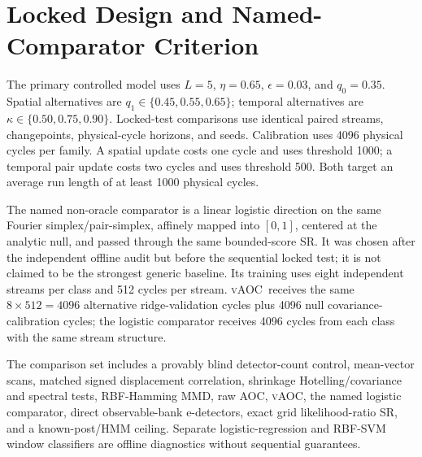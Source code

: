 \documentclass[letterpaper,journal]{IEEEtran}
\newcommand{\AOC}{\textsc{AOC}}
\newcommand{\vAOC}{\textsc{vAOC}}
\begin{document}
\section{Locked Design and Named-Comparator Criterion}

The primary controlled model uses $L=5$, $\eta=0.65$,
$\epsilon=0.03$, and $q_0=0.35$. Spatial alternatives are
$q_1\in\{0.45,0.55,0.65\}$; temporal alternatives are
$\kappa\in\{0.50,0.75,0.90\}$. Locked-test comparisons use identical paired
streams, changepoints, physical-cycle horizons, and seeds. Calibration uses
4096 physical cycles per family. A spatial update costs one cycle and uses
threshold 1000; a temporal pair update costs two cycles and uses threshold
500. Both target an average run length of at least 1000 physical cycles.

The named non-oracle comparator is a linear logistic direction on the same
Fourier simplex/pair-simplex, affinely mapped into $[0,1]$, centered at the
analytic null, and passed through the same bounded-score SR. It was chosen
after the independent offline audit but before the sequential locked test; it
is not claimed to be the strongest generic baseline. Its training uses eight
independent streams per class and 512 cycles per stream. \vAOC\ receives the
same $8\times512=4096$ alternative ridge-validation cycles plus 4096 null
covariance-calibration cycles; the logistic comparator receives 4096 cycles
from each class with the same stream structure.

The comparison set includes a provably blind detector-count control,
mean-vector scans, matched signed displacement correlation, shrinkage
Hotelling/covariance and spectral tests, RBF-Hamming MMD, raw \AOC,
\vAOC, the named logistic comparator, direct observable-bank e-detectors,
exact grid likelihood-ratio SR, and a known-post/HMM ceiling. Separate
logistic-regression and RBF-SVM window classifiers are offline diagnostics
without sequential guarantees.
\end{document}
